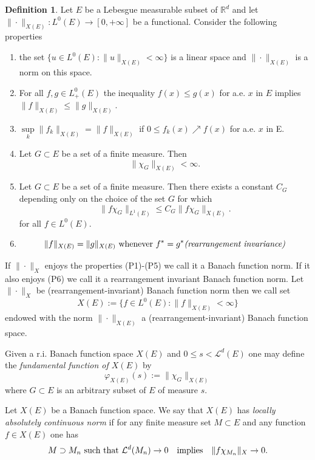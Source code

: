 \documentclass[12pt,a4paper]{amsart}
\theoremstyle{plain}
\theoremstyle{definition}
\newtheorem{definition}[thm]{Definition}
\numberwithin{equation}{section}
\begin{document}
	\begin{definition}\label{RIS}
		Let $E$ be a Lebesgue measurable subset of $\mathbb R^d$ and let $\| \cdot \|_{X(E)}: L^0(E) \rightarrow [0, +\infty]$ be a functional. Consider the following properties
		\begin{enumerate}[\upshape(P1)]
			\item the set $\{u\in L^0(E): \|u\|_{X(E)} < \infty \}$ is a linear space and $\|\cdot\|_{X(E)}$ is a norm on this space.\label{primo}
			\item For all $f,g\in L^0_+(E)$ the inequality $f(x)\leq g(x)$  for a.e. $x$ in $E$ implies $\| f\|_{X(E)}\leq \|g\|_{X(E)}$. 
			\item $\sup\limits_{k}\| f_k\|_{X(E)}= \| f\|_{X(E)}$ if $0\leq f_k(x) \nearrow f(x)$ for a.e. $x$ in E.
			
			\item Let $G\subset E$ be a set of a finite measure. Then
			$$
			\|\chi_G\|_{X(E)}<\infty.
			$$
			\item Let $G\subset E$ be a set of a finite measure. Then there exists a constant $C_G$ depending only on the choice of the set $G$ for which
			$$
			\|f\chi_G\|_{L^1(E)}\leq C_G\|f\chi_G\|_{X(E)}.
			$$
			for all $f\in L^0(E)$.
			
			\item \label{ultimo}$$
			\| f\|_{X(E)}= \|g\|_{X(E)}\text{ whenever } f^*= g^* \text{\emph{(rearrangement invariance)}}
			$$
		\end{enumerate}
		If $\|\cdot\|_X$ enjoys the properties (P1)-(P5) we call it a Banach function norm. If it also enjoys (P6) we call it a rearrangement invariant Banach function norm. Let $\|\cdot\|_X$ be (rearrangement-invariant) Banach function norm then we call set
		$$
		X(E):=\{f\in L^0(E):\|f\|_{X(E)}<\infty\}
		$$
		endowed with the norm $\|\cdot\|_{X(E)}$ a (rearrangement-invariant) Banach function space.
	\end{definition}
	
	Given a r.i. Banach function space $X(E)$ and $0\leq s < \mathcal{L}^d(E)$ one may define the \textit{fundamental function of $X(E)$} by
	\begin{equation}\label{Jihad}
		\varphi_{X(E)}(s):= \| \chi_G\|_{X(E)}
	\end{equation}
	where $G\subset E$ is an arbitrary subset of $E$ of measure $s$.
	
	Let $X(E)$ be a Banach function space. We say that $X(E)$ has \textit{locally absolutely continuous norm} if for any finite measure set $M\subset E$ and any function $f\in X(E)$ one has 
	$$
	M\supset M_n \textup{ such that } \mathcal L^{d}(M_n)\rightarrow 0\quad\textup{implies}\quad \|f\chi_{M_n}\|_X\rightarrow 0. 
	$$
	
\end{document}
